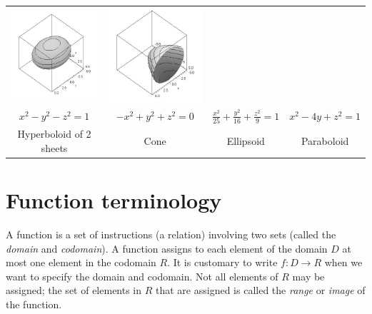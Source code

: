 \begin{center}
\begin{tabular}{cccc}
\includegraphics[width=\mywidth]{functions/quadric-7}&
\includegraphics[width=\mywidth]{functions/quadric-8}
\\
$x^2-y^2-z^2=1$ &
$-x^2+y^2+z^2=0$ &
$\frac{x^2}{25}+\frac{y^2}{16}+\frac{z^2}{9}=1$ &
$x^2-4y+z^2=1$
\\
Hyperboloid of 2 sheets&
Cone &
Ellipsoid &
Paraboloid
\end{tabular}
\end{center}






\section{Function terminology}
A function is a set of instructions (a relation) involving two sets
(called the \emph{domain} and \emph{codomain}).  A function assigns to
each element of the domain $D$ at most one element in the codomain
$R$. It is customary to write {$f\colon D\to R$} when we want to
specify the domain and codomain.  Not all elements of $R$ may be
assigned; the set of elements in $R$ that are assigned is called the
\emph{range} or \emph{image} of the function.


